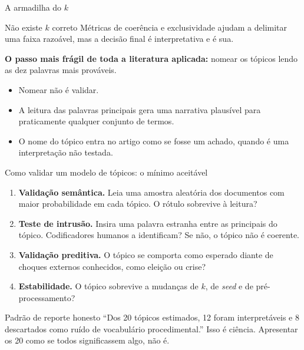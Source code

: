 \documentclass[11pt,aspectratio=169]{beamer}
\begin{document}
\begin{frame}{A armadilha do $k$}
\begin{alertblock}{Não existe $k$ correto}
Métricas de coerência e exclusividade ajudam a delimitar uma faixa razoável, mas
a decisão final é interpretativa e é sua.
\end{alertblock}
\vspace{0.35cm}
\textbf{O passo mais frágil de toda a literatura aplicada:} nomear os tópicos
lendo as dez palavras mais prováveis.
\vspace{0.25cm}
\begin{itemize}
  \item Nomear não é validar.
  \item A leitura das palavras principais gera uma narrativa plausível para
        praticamente qualquer conjunto de termos.
  \item O nome do tópico entra no artigo como se fosse um achado, quando é uma
        interpretação não testada.
\end{itemize}
\end{frame}

\begin{frame}{Como validar um modelo de tópicos: o mínimo aceitável}
\begin{enumerate}
  \item \textbf{Validação semântica.} Leia uma amostra aleatória dos documentos
        com maior probabilidade em cada tópico. O rótulo sobrevive à leitura?
  \vspace{0.12cm}
  \item \textbf{Teste de intrusão.} Insira uma palavra estranha entre as
        principais do tópico. Codificadores humanos a identificam? Se não, o
        tópico não é coerente.
  \vspace{0.12cm}
  \item \textbf{Validação preditiva.} O tópico se comporta como esperado diante
        de choques externos conhecidos, como eleição ou crise?
  \vspace{0.12cm}
  \item \textbf{Estabilidade.} O tópico sobrevive a mudanças de $k$, de
        \emph{seed} e de pré-processamento?
\end{enumerate}
\pause
\vspace{0.25cm}
\begin{block}{Padrão de reporte honesto}
\small ``Dos 20 tópicos estimados, 12 foram interpretáveis e 8 descartados como
ruído de vocabulário procedimental.'' Isso é ciência. Apresentar os 20 como se
todos significassem algo, não é.
\end{block}
\end{frame}
\end{document}
